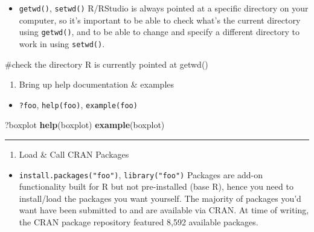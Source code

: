 \documentclass[]{book}
\newenvironment{Shaded}{\begin{snugshade}}{\end{snugshade}}
\newcommand{\KeywordTok}[1]{\textcolor[rgb]{0.13,0.29,0.53}{\textbf{#1}}}
\newcommand{\NormalTok}[1]{#1}
\providecommand{\tightlist}{%
  \setlength{\itemsep}{0pt}\setlength{\parskip}{0pt}}
\begin{document}
\begin{itemize}
\tightlist
\item
  \texttt{getwd()}, \texttt{setwd()}
  R/RStudio is always pointed at a specific directory on your computer, so it's important to be able to check what's the current directory using \texttt{getwd()}, and to be able to change and specify a different directory to work in using \texttt{setwd()}.
\end{itemize}

\#check the directory R is currently pointed at
getwd()

\begin{enumerate}
\def\labelenumi{\arabic{enumi}.}
\setcounter{enumi}{1}
\tightlist
\item
  Bring up help documentation \& examples
\end{enumerate}

\begin{itemize}
\tightlist
\item
  \texttt{?foo}, \texttt{help(foo)}, \texttt{example(foo)}
\end{itemize}

\begin{Shaded}
\begin{Highlighting}[]
\NormalTok{?boxplot}
\KeywordTok{help}\NormalTok{(boxplot)}
\KeywordTok{example}\NormalTok{(boxplot)}
\end{Highlighting}
\end{Shaded}

\begin{center}\rule{0.5\linewidth}{0.5pt}\end{center}

\begin{enumerate}
\def\labelenumi{\arabic{enumi}.}
\setcounter{enumi}{2}
\tightlist
\item
  Load \& Call CRAN Packages
\end{enumerate}

\begin{itemize}
\tightlist
\item
  \texttt{install.packages("foo")}, \texttt{library("foo")}
  Packages are add-on functionality built for R but not pre-installed (base R), hence you need to install/load the packages you want yourself. The majority of packages you'd want have been submitted to and are available via CRAN. At time of writing, the CRAN package repository featured 8,592 available packages.
\end{itemize}
\end{document}

